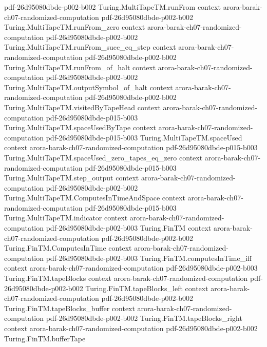 \begin{theorem}
  {pdf-26d95080dbde-p002-b002}
\proofstep
  {Turing.MultiTapeTM.runFrom}
  {context}
  {arora-barak-ch07-randomized-computation}
  {pdf-26d95080dbde-p002-b002}
\proofstep
  {Turing.MultiTapeTM.runFrom_zero}
  {context}
  {arora-barak-ch07-randomized-computation}
  {pdf-26d95080dbde-p002-b002}
\proofstep
  {Turing.MultiTapeTM.runFrom_succ_eq_step}
  {context}
  {arora-barak-ch07-randomized-computation}
  {pdf-26d95080dbde-p002-b002}
\proofstep
  {Turing.MultiTapeTM.runFrom_of_halt}
  {context}
  {arora-barak-ch07-randomized-computation}
  {pdf-26d95080dbde-p002-b002}
\proofstep
  {Turing.MultiTapeTM.outputSymbol_of_halt}
  {context}
  {arora-barak-ch07-randomized-computation}
  {pdf-26d95080dbde-p002-b002}
\proofstep
  {Turing.MultiTapeTM.visitedByTapeHead}
  {context}
  {arora-barak-ch07-randomized-computation}
  {pdf-26d95080dbde-p015-b003}
\proofstep
  {Turing.MultiTapeTM.spaceUsedByTape}
  {context}
  {arora-barak-ch07-randomized-computation}
  {pdf-26d95080dbde-p015-b003}
\proofstep
  {Turing.MultiTapeTM.spaceUsed}
  {context}
  {arora-barak-ch07-randomized-computation}
  {pdf-26d95080dbde-p015-b003}
\proofstep
  {Turing.MultiTapeTM.spaceUsed_zero_tapes_eq_zero}
  {context}
  {arora-barak-ch07-randomized-computation}
  {pdf-26d95080dbde-p015-b003}
\proofstep
  {Turing.MultiTapeTM.step_output}
  {context}
  {arora-barak-ch07-randomized-computation}
  {pdf-26d95080dbde-p002-b002}
\proofstep
  {Turing.MultiTapeTM.ComputesInTimeAndSpace}
  {context}
  {arora-barak-ch07-randomized-computation}
  {pdf-26d95080dbde-p015-b003}
\proofstep
  {Turing.MultiTapeTM.indicator}
  {context}
  {arora-barak-ch07-randomized-computation}
  {pdf-26d95080dbde-p002-b003}
\proofstep
  {Turing.FinTM}
  {context}
  {arora-barak-ch07-randomized-computation}
  {pdf-26d95080dbde-p002-b002}
\proofstep
  {Turing.FinTM.ComputesInTime}
  {context}
  {arora-barak-ch07-randomized-computation}
  {pdf-26d95080dbde-p002-b003}
\proofstep
  {Turing.FinTM.computesInTime_iff}
  {context}
  {arora-barak-ch07-randomized-computation}
  {pdf-26d95080dbde-p002-b003}
\proofstep
  {Turing.FinTM.tapeBlocks}
  {context}
  {arora-barak-ch07-randomized-computation}
  {pdf-26d95080dbde-p002-b002}
\proofstep
  {Turing.FinTM.tapeBlocks_left}
  {context}
  {arora-barak-ch07-randomized-computation}
  {pdf-26d95080dbde-p002-b002}
\proofstep
  {Turing.FinTM.tapeBlocks_buffer}
  {context}
  {arora-barak-ch07-randomized-computation}
  {pdf-26d95080dbde-p002-b002}
\proofstep
  {Turing.FinTM.tapeBlocks_right}
  {context}
  {arora-barak-ch07-randomized-computation}
  {pdf-26d95080dbde-p002-b002}
\proofstep
  {Turing.FinTM.bufferTape}

\end{theorem}
